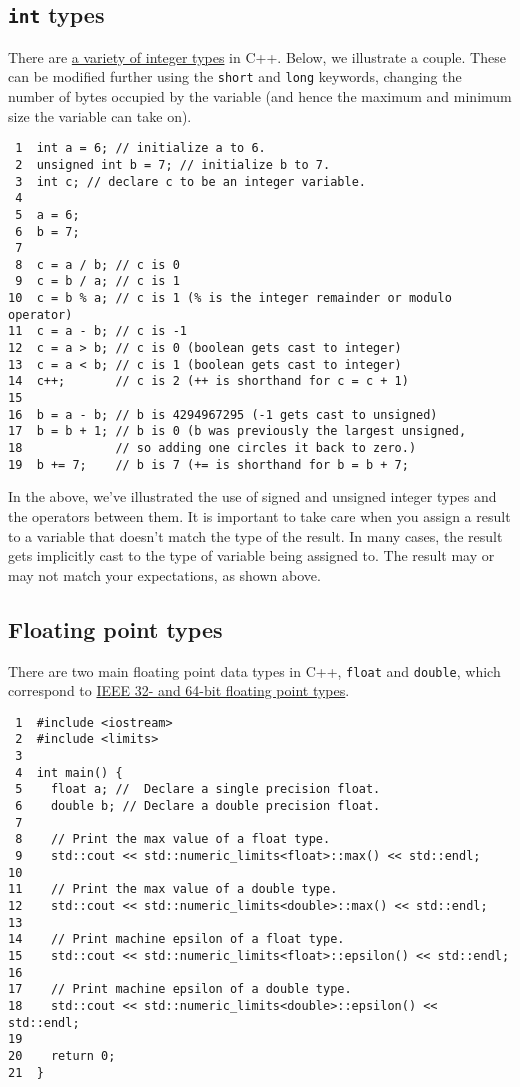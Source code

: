\documentclass[11pt]{article}
\begin{document}
\subsection{\texttt{int} types}
\label{sec:orgheadline12}

There are \href{http://en.cppreference.com/w/cpp/language/types}{a variety of integer types} in C++. Below, we illustrate a 
couple. These can be modified further using the \texttt{short} and \texttt{long} 
keywords, changing the number of bytes occupied by the variable (and 
hence the maximum and minimum size the variable can take on).

\begin{verbatim}
 1  int a = 6; // initialize a to 6.
 2  unsigned int b = 7; // initialize b to 7.
 3  int c; // declare c to be an integer variable.
 4  
 5  a = 6;
 6  b = 7;
 7  
 8  c = a / b; // c is 0
 9  c = b / a; // c is 1
10  c = b % a; // c is 1 (% is the integer remainder or modulo operator)
11  c = a - b; // c is -1
12  c = a > b; // c is 0 (boolean gets cast to integer)
13  c = a < b; // c is 1 (boolean gets cast to integer)
14  c++;       // c is 2 (++ is shorthand for c = c + 1)
15  
16  b = a - b; // b is 4294967295 (-1 gets cast to unsigned)
17  b = b + 1; // b is 0 (b was previously the largest unsigned,
18             // so adding one circles it back to zero.)
19  b += 7;    // b is 7 (+= is shorthand for b = b + 7;
\end{verbatim}

In the above, we've illustrated the use of signed and unsigned 
integer types and the operators between them. It is important to 
take care when you assign a result to a variable that doesn't match 
the type of the result. In many cases, the result gets implicitly 
cast to the type of variable being assigned to. The result may or 
may not match your expectations, as shown above.

\subsection{Floating point types}
\label{sec:orgheadline13}
There are two main floating point data types in C++, \texttt{float} and \texttt{double},
which correspond to \href{https://en.wikipedia.org/wiki/IEEE_floating_point}{IEEE 32- and 64-bit floating point types}. 

\begin{verbatim}
 1  #include <iostream>
 2  #include <limits>
 3  
 4  int main() {
 5    float a; //  Declare a single precision float.
 6    double b; // Declare a double precision float.
 7  
 8    // Print the max value of a float type.
 9    std::cout << std::numeric_limits<float>::max() << std::endl;
10  
11    // Print the max value of a double type.
12    std::cout << std::numeric_limits<double>::max() << std::endl;
13  
14    // Print machine epsilon of a float type.
15    std::cout << std::numeric_limits<float>::epsilon() << std::endl;
16  
17    // Print machine epsilon of a double type.
18    std::cout << std::numeric_limits<double>::epsilon() << std::endl;
19  
20    return 0;
21  }
\end{verbatim}
\end{document}

